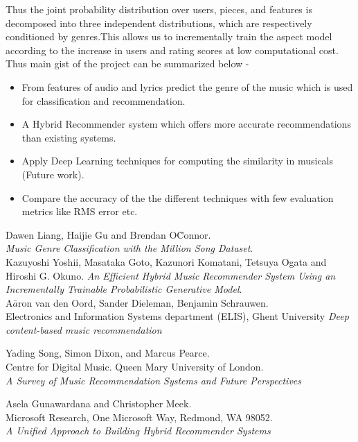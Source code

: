 \documentclass{sig-alternate-05-2015}
\begin{document}
Thus the joint probability distribution over users, pieces, and features is decomposed into three independent distributions, which are respectively conditioned by genres.This allows us to incrementally train the aspect model according to the increase in users and rating scores at low computational cost.\\

Thus main gist of the project can be summarized below -\\

\begin{itemize}
    \item From features of audio and lyrics predict the genre of the music which is used for classification and recommendation.
    \item A Hybrid Recommender system which offers more accurate recommendations than existing systems.
    \item Apply Deep Learning techniques for computing the similarity in musicals (Future work).
    \item Compare the accuracy of the the different techniques with few evaluation metrics like RMS error etc.
\end{itemize}

\begin{thebibliography}{}
Dawen Liang, Haijie Gu and Brendan O\`Connor.\\
\textit{Music Genre Classification with the Million Song Dataset}. \\
 
Kazuyoshi Yoshii, Masataka Goto, Kazunori Komatani, Tetsuya Ogata and Hiroshi G. Okuno.
\textit{An Efficient Hybrid Music Recommender System Using an Incrementally Trainable Probabilistic Generative Model}. \\

A$\bar{a}$ron van den Oord, Sander Dieleman, Benjamin Schrauwen. \\
Electronics and Information Systems department (ELIS), Ghent University
\textit{Deep content-based music recommendation}

Yading Song, Simon Dixon, and Marcus Pearce.\\
Centre for Digital Music. Queen Mary University of London.\\
\textit{A Survey of Music Recommendation Systems and Future Perspectives}

Asela Gunawardana and Christopher Meek.\\
Microsoft Research, One Microsoft Way, Redmond, WA 98052.\\
\textit{A Unified Approach to Building Hybrid Recommender Systems}

\end{thebibliography}

\end{document}

